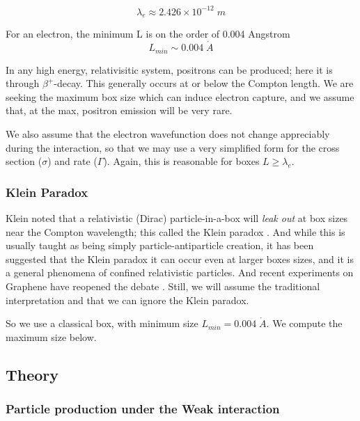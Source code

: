\documentclass[%
 aip,
 jmp,%
 amsmath,amssymb,
 reprint,%
]{revtex4-1}
\begin{document}
$$\lambda_{e}\approx2.426\times 10^{-12}\;m$$

For an electron, the minimum L is on the order of 0.004 Angstrom 
$$L_{min}\sim0.004\;\mathring{A}$$ 

In any high energy, relativisitic system, positrons can be produced; here it is through $\beta^{+}$-decay. This generally occurs at or below the Compton length. We are seeking the maximum box size which can induce electron capture, and we assume that, at the max, positron emission will be very rare.

We also assume that the electron wavefunction does not change appreciably during the interaction, so that we may use a very simplified form for the cross section ($\sigma$) and rate ($\Gamma$).  Again, this is reasonable for boxes $L\ge\lambda_{e}$.

\subsubsection{Klein Paradox}

Klein noted that a relativistic (Dirac) particle-in-a-box will \emph{leak out} at box sizes near the Compton wavelength; this called the Klein paradox \cite{klein1,klein2}.  And while this is usually taught as being simply particle-antiparticle creation, it has been suggested that the Klein paradox it can occur even at larger boxes sizes, and it is a general phenomena of confined relativistic particles.  And recent experiments on Graphene have reopened the debate \cite{klein3}. Still, we will assume the traditional interpretation and that we can ignore the Klein paradox.

So we use a classical box, with minimum size $L_{min}=0.004\;\mathring{A}$.  We compute the maximum size below.


\subsection{Theory}

\subsubsection{Particle production under the Weak interaction}
\end{document}
